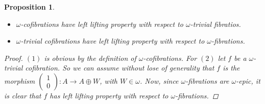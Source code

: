 \documentclass[12pt]{amsart}
\numberwithin{equation}{section}
\newtheorem{proposition}[lemma]{Proposition}
\theoremstyle{definition}
\newtheorem*{theorem 0*}{Theorem}
\newtheorem*{theorem a*}{Theorem A}
\newtheorem*{theorem b*}{Theorem B}
\numberwithin{diagram}{section}
\begin{document}
\begin{proposition}\label{3.8}
\begin{itemize}
\item[(1)]
$\omega$-cofibrations have left lifting property with respect to $\omega$-trivial fibratios.
\item[(2)]
$\omega$-trivial cofibrations have left lifting property with respect to $\omega$-fibrations.
\end{itemize}
\begin{proof}
$(1)$ is obvious by the definition of $\omega$-cofibrations.
For $(2)$ let $f$ be a $\omega$-trivial cofibration. So we can assume without lose of generality that $f$ is the morphism $\begin{pmatrix}
1\\
0
\end{pmatrix}:A\rightarrow A\oplus W$, with $W\in\omega$. Now, since $\omega$-fibrations are $\omega$-epic, it is clear that $f$ has left lifting property with respect to $\omega$-fibrations.
\end{proof}
\end{proposition}
\end{document}
